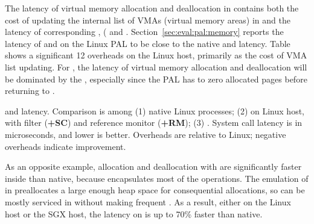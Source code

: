 \label{sec:eval:libos:vma}

The latency of virtual memory allocation
and deallocation in \thelibos{}
contains both the cost of updating the internal list of VMAs (virtual memory areas) in \thelibos{}
and the latency of corresponding \hostapis{}, ( and .
Section~\ref{sec:eval:pal:memory}
reports the latency of  and 
on the Linux PAL
to be close to the native 
and  latency.
Table~\label{tab:eval:libos:lmbench-vma} shows a significant 12\x{} overheads
on the Linux host,
primarily as the cost of VMA list updating.
For \graphenesgx{},
the latency of virtual memory allocation
and deallocation will be dominated by the \hostapis{}, especially since the \sgx{} PAL has to zero allocated pages before returning to \thelibos{}.



\begin{table}[t!b!]

\caption{ and  latency. Comparison is among (1) native Linux processes; (2) \graphene{} on Linux host, with \seccomp{} filter ({\bf +SC}) and reference monitor ({\bf +RM}); (3) \graphenesgx{}.
System call latency is in microseconds, and lower is better.
Overheads are relative to Linux; negative overheads indicate improvement.} 
\label{tab:eval:libos:lmbench-vma}
\end{table}


As an opposite example, allocation and deallocation
with  are
significantly faster inside \thelibos{}
than native,
because \thelibos{} encapsulates most of the operations.
The emulation of  in \thelibos{}
preallocates a large enough
heap space for consequential allocations,
so  can be mostly serviced in \thelibos{}
without making frequent \hostapis{}.
As a result, either on the Linux host or the SGX host,
the latency on 
is up to 70\% faster than native.

